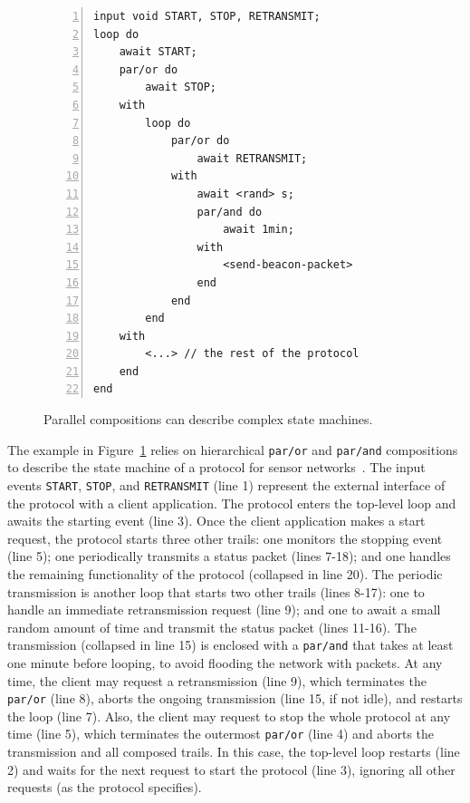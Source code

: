 \documentclass{acm_proc_article-sp}
\newcommand{\code}[1] {{\small{\texttt{#1}}}}
\newcommand{\1}{\;}
\newcommand{\2}{\;\;}
\newcommand{\3}{\;\;\;}
\newcommand{\5}{\;\;\;\;\;}
\begin{document}

\begin{figure}[t]
\begin{lstlisting}[numbers=left,xleftmargin=3em]
input void START, STOP, RETRANSMIT;
loop do
    await START;
    par/or do
        await STOP;
    with
        loop do
            par/or do
                await RETRANSMIT;
            with
                await <rand> s;
                par/and do
                    await 1min;
                with
                    <send-beacon-packet>
                end
            end
        end
    with
        <...> // the rest of the protocol
    end
end
\end{lstlisting}
\caption{ Parallel compositions can describe complex state machines.
\label{lst.ctp}
}
\end{figure}

The example in Figure~\ref{lst.ctp} relies on hierarchical \code{par/or} and 
\code{par/and} compositions to describe the state machine of a protocol for 
sensor networks~\cite{wsn.ctp,ceu.sensys13}.
%
The input events \code{START}, \code{STOP}, and \code{RETRANSMIT} (line 1) 
represent the external interface of the protocol with a client application.
%
The protocol enters the top-level loop and awaits the starting event (line 3).
Once the client application makes a start request, the protocol starts three 
other trails:
one monitors the stopping event (line 5);
one periodically transmits a status packet (lines 7-18);
and one handles the remaining functionality of the protocol (collapsed in line 
20).
%
The periodic transmission is another loop that starts two other trails (lines 
8-17):
one to handle an immediate retransmission request (line 9);
and one to await a small random amount of time and transmit the status packet 
(lines 11-16).
%
The transmission (collapsed in line 15) is enclosed with a \code{par/and} that 
takes at least one minute before looping, to avoid flooding the network with 
packets.
%
At any time, the client may request a retransmission (line 9), which terminates 
the \code{par/or} (line 8), aborts the ongoing transmission (line 15, if not 
idle), and restarts the loop (line 7).
%
Also, the client may request to stop the whole protocol at any time (line 5), 
which terminates the outermost \code{par/or} (line 4) and aborts the 
transmission and all composed trails.
In this case, the top-level loop restarts (line 2) and waits for the next 
request to start the protocol (line 3), ignoring all other requests (as the 
protocol specifies).
\end{document}
